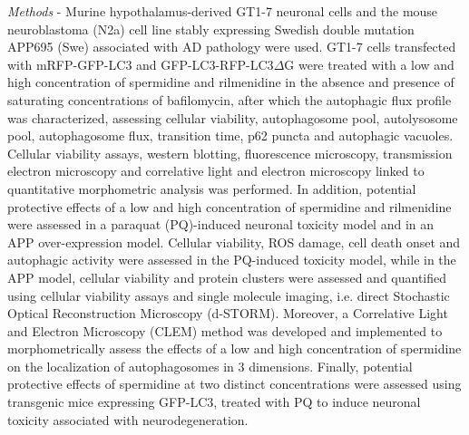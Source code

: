 \textit{Methods} - Murine hypothalamus-derived GT1-7 neuronal cells and the mouse neuroblastoma (N2a) cell line stably expressing Swedish double mutation APP695 (Swe) associated with AD pathology were used. GT1-7 cells transfected with mRFP-GFP-LC3 and GFP-LC3-RFP-LC3$\Delta$G were treated with a low and high concentration of spermidine and rilmenidine in the absence and presence of saturating concentrations of bafilomycin, after which the autophagic flux profile was characterized, assessing cellular viability, autophagosome pool, autolysosome pool, autophagosome flux, transition time, p62 puncta and autophagic vacuoles. Cellular viability assays, western blotting, fluorescence microscopy, transmission electron microscopy and correlative light and electron microscopy linked to quantitative morphometric analysis was performed. In addition, potential protective effects of a low and high concentration of spermidine and rilmenidine were assessed in a paraquat (PQ)-induced neuronal toxicity model and in an APP over-expression model. Cellular viability, ROS damage, cell death onset and autophagic activity were assessed in the PQ-induced toxicity model, while in the APP model, cellular viability and protein clusters were assessed and quantified using cellular viability assays and single molecule imaging, i.e. direct Stochastic Optical Reconstruction Microscopy (d-STORM). Moreover, a Correlative Light and Electron Microscopy (CLEM) method was developed and implemented to morphometrically assess the effects of a low and high concentration of spermidine on the localization of autophagosomes in 3 dimensions. Finally, potential protective effects of spermidine at two distinct concentrations were assessed using transgenic mice expressing GFP-LC3, treated with PQ to induce neuronal toxicity associated with neurodegeneration.

